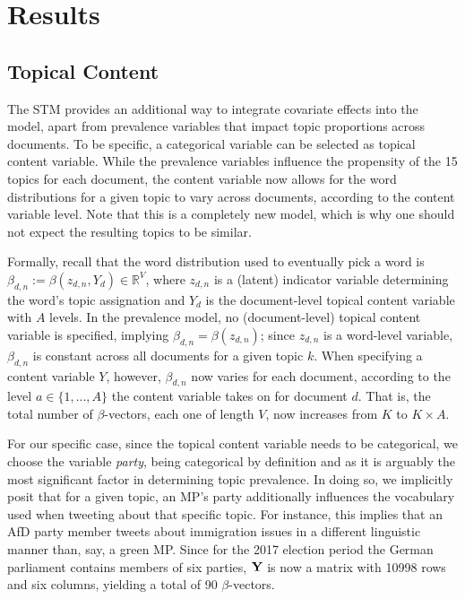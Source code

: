 \documentclass[12pt]{article}
\begin{document}
\section{Results}

\subsection{Topical Content}

The STM provides an additional way to integrate covariate effects into the model, apart from prevalence variables that impact topic proportions across documents. To be specific, a categorical variable can be selected as topical content variable. While the prevalence variables influence the propensity of the 15 topics for each document, the content variable now allows for the word distributions for a given topic to vary across documents, according to the content variable level. Note that this is a completely new model, which is why one should not expect the resulting topics to be similar. 

Formally, recall that the word distribution used to eventually pick a word is $\beta_{d,n} := \beta(z_{d,n}, Y_d) \in \mathbb{R}^V$, where $z_{d,n}$ is a (latent) indicator variable determining the word's topic assignation and $Y_{d}$ is the document-level topical content variable with $A$ levels. In the prevalence model, no (document-level) topical content variable is specified, implying $\beta_{d,n} = \beta(z_{d,n})$; since $z_{d,n}$ is a word-level variable, $\beta_{d,n}$ is constant across all documents for a given topic $k$. When specifying a content variable $Y$, however, $\beta_{d,n}$ now varies for each document, according to the level $a \in \{1, ..., A\}$ the content variable takes on for document $d$. That is, the total number of $\beta$-vectors, each one of length $V$, now increases from $K$ to $K \times A$.

For our specific case, since the topical content variable needs to be categorical, we choose the variable \textit{party}, being categorical by definition and as it  is arguably the most significant factor in determining topic prevalence. In doing so, we implicitly posit that for a given topic, an MP's party additionally influences the vocabulary used when tweeting about that specific topic. For instance, this implies that an AfD party member tweets about immigration issues in a different linguistic manner than, say, a green MP. Since for the 2017 election period the German parliament contains members of six parties, $\bf{Y}$ is now a matrix with 10998 rows and six columns, yielding a total of 90 $\beta$-vectors.
\end{document}
